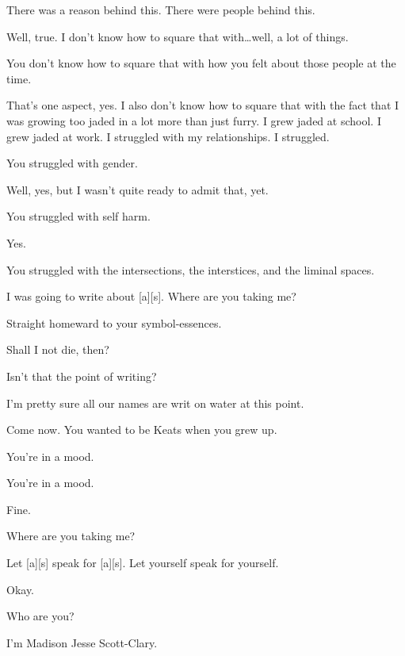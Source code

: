 \begin{leftcolumn}
\begin{ally}
There was a reason behind this. There were people behind this.
\end{ally}
Well, true. I don't know how to square that with\ldots{}well, a lot of things.

\begin{ally}
You don't know how to square that with how you felt about those people at the time.
\end{ally}
That's one aspect, yes. I also don't know how to square that with the fact that I was growing too jaded in a lot more than just furry. I grew jaded at school. I grew jaded at work. I struggled with my relationships. I struggled.

\begin{ally}
You struggled with gender.
\end{ally}
Well, yes, but I wasn't quite ready to admit that, yet.

\begin{ally}
You struggled with self harm.
\end{ally}
Yes.

\begin{ally}
You struggled with the intersections, the interstices, and the liminal spaces.
\end{ally}
I was going to write about {[}a{]}{[}s{]}. Where are you taking me?

\begin{ally}
Straight homeward to your symbol-essences.
\end{ally}
Shall I not die, then?

\begin{ally}
Isn't that the point of writing?
\end{ally}
I'm pretty sure all our names are writ on water at this point.

\begin{ally}
Come now. You wanted to be Keats when you grew up.
\end{ally}
You're in a mood.

\begin{ally}
You're in a mood.
\end{ally}
Fine.

Where are you taking me?

\begin{ally}
Let {[}a{]}{[}s{]} speak for {[}a{]}{[}s{]}. Let yourself speak for yourself.
\end{ally}
Okay.
\newpage

\begin{ally}
Who are you?
\end{ally}
I'm Madison Jesse Scott-Clary.


\end{leftcolumn}

